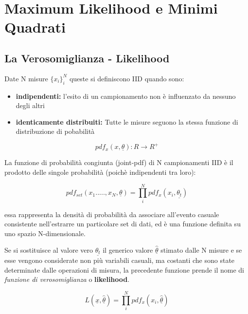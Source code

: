 \setcounter{chapter}{4}
\chapter{Maximum Likelihood e Minimi Quadrati}

\section{La Verosomiglianza - Likelihood}

Date N misure  $\{x_{i}\}_{i}^N$ queste si definiscono IID quando sono:
\begin{itemize}
\item \textbf{indipendenti:} l'esito di un campionamento non \`{e} influenzato da nessuno degli altri
\item \textbf{identicamente distribuiti:} Tutte le misure seguono la stessa funzione di distribuzione di pobabilit\`{a}
\end{itemize}
\begin{equation*}
		pdf_x(x,\underline{\theta}): R \rightarrow R^+
\end{equation*}

\noindent La funzione di probabilit\`{a} congiunta (joint-pdf) di N campionamenti IID \`{e} il prodotto delle singole probabilit\`{a} (poich\`{e} indipendenti tra loro):

\begin{equation*}
		pdf_{set}(x_1.....,x_N,\underline{\theta}) = \prod_{i}^N pdf_{x}(x_i,\underline{\theta_{t}})	
\end{equation*}

\noindent essa rappresenta la densit\`{a} di probabilit\`{a} da associare all'evento casuale consistente nell'estrarre un particolare set di dati, ed \`{e} una funzione definita su uno spazio N-dimensionale.\newline

\noindent Se si sostituisce al valore vero $\underline{\theta_{t}}$ il generico valore $\underline{\hat{\theta}}$ stimato dalle N misure e se esse vengono considerate non pi\`{u} variabili casuali, ma costanti che sono state determinate dalle operazioni di misura, la precedente funzione prende il nome di \textit{funzione di verosomiglianza} o \textbf{likelihood}.

\begin{equation*}
		 L(\underline{x},\underline{\hat{\theta}}) = \prod_{i}^N pdf_{x}(x_i,\underline{\hat{\theta}}) 
\end{equation*}


